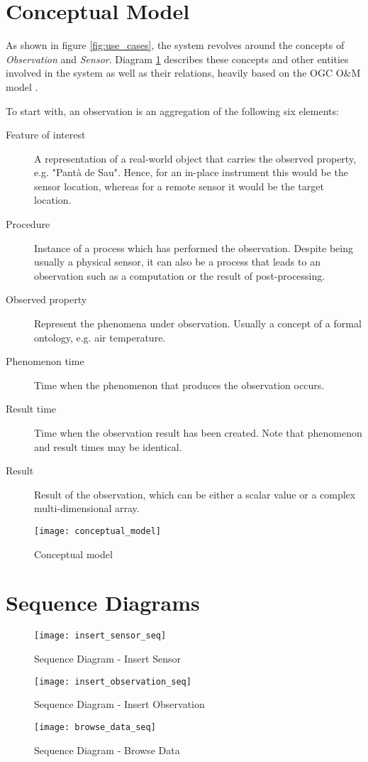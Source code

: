 \section{Conceptual Model}

As shown in figure \ref{fig:use_cases}, the system revolves around the concepts of \textit{Observation} and \textit{Sensor}. Diagram \ref{fig:conceptual_model} describes these concepts and other entities involved in the system as well as their relations, heavily based on the OGC O\&M model \cite{OM}.

To start with, an observation is an aggregation of the following six elements:

\begin{description}
\item[Feature of interest] A representation of a real-world object that carries the observed property, e.g. "Pant\`a de Sau". Hence, for an in-place instrument this would be the sensor location, whereas for a remote sensor it would be the target location.
\item[Procedure] Instance of a process which has performed the observation. Despite being usually a physical sensor, it can also be a process that leads to an observation such as a computation or the result of post-processing.
\item[Observed property] Represent the phenomena under observation. Usually a concept of a formal ontology, e.g. air temperature.
\item[Phenomenon time] Time when the phenomenon that produces the observation occurs.
\item[Result time] Time when the observation result has been created. Note that phenomenon and result times may be identical.
\item[Result] Result of the observation, which can be either a scalar value or a complex multi-dimensional array.
\end{description}

\begin{figure}[h]
	\centering
	\texttt{[image: conceptual\_model]}
	\caption{Conceptual model}
	\label{fig:conceptual_model}
\end{figure}
\newpage

\section{Sequence Diagrams}

\begin{figure}[ht]
	\centering
	\texttt{[image: insert\_sensor\_seq]}
	\caption{Sequence Diagram - Insert Sensor}
	\label{fig:insert_sensor_seq}
\end{figure}

\begin{figure}[ht]
	\centering
	\texttt{[image: insert\_observation\_seq]}
	\caption{Sequence Diagram - Insert Observation}
	\label{fig:insert_observation_seq}
\end{figure}

\begin{figure}[ht]
	\centering
	\texttt{[image: browse\_data\_seq]}
	\caption{Sequence Diagram - Browse Data}
	\label{fig:browse_data_seq}
\end{figure}
